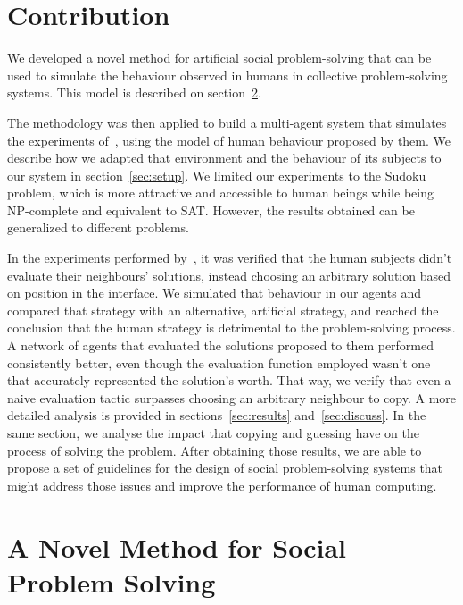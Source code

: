 \documentclass{article}
\begin{document}
\section{Contribution}

We developed a novel method for artificial social problem-solving that can be used to simulate the behaviour observed in humans in collective problem-solving systems. This model is described on section~\ref{sec:model}.

The methodology was then applied to build a multi-agent system that simulates the experiments of~\cite{farenzena:collabem}, using the model of human behaviour proposed by them. We describe how we adapted that environment and the behaviour of its subjects to our system in section~\ref{sec:setup}. We limited our experiments to the Sudoku problem, which is more attractive and accessible to human beings while being NP-complete and equivalent to SAT. However, the results obtained can be generalized to different problems.

In the experiments performed by~\cite{farenzena:collabem}, it was verified that the human subjects didn't evaluate their neighbours' solutions, instead choosing an arbitrary solution based on position in the interface. We simulated that behaviour in our agents and compared that strategy with an alternative, artificial strategy, and reached the conclusion that the human strategy is detrimental to the problem-solving process. A network of agents that evaluated the solutions proposed to them performed consistently better, even though the evaluation function employed wasn't one that accurately represented the solution's worth. That way, we verify that even a naive evaluation tactic surpasses choosing an arbitrary neighbour to copy. A more detailed analysis is provided in sections~\ref{sec:results} and~\ref{sec:discuss}. In the same section, we analyse the impact that copying and guessing have on the process of solving the problem. After obtaining those results, we are able to propose a set of guidelines for the design of social problem-solving systems that might address those issues and improve the performance of human computing.

\section{A Novel Method for %
Social Problem Solving}
\label{sec:model}
\end{document}
